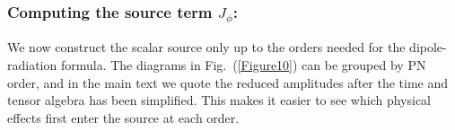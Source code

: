 \subsubsection*{Computing the source term $J_{\phi}$:}
We now construct the scalar source only up to the orders needed for the dipole-radiation formula. The diagrams in Fig.~(\ref{Figure10}) can be grouped by PN order, and in the main text we quote the reduced amplitudes after the time and tensor algebra has been simplified. This makes it easier to see which physical effects first enter the source at each order.
